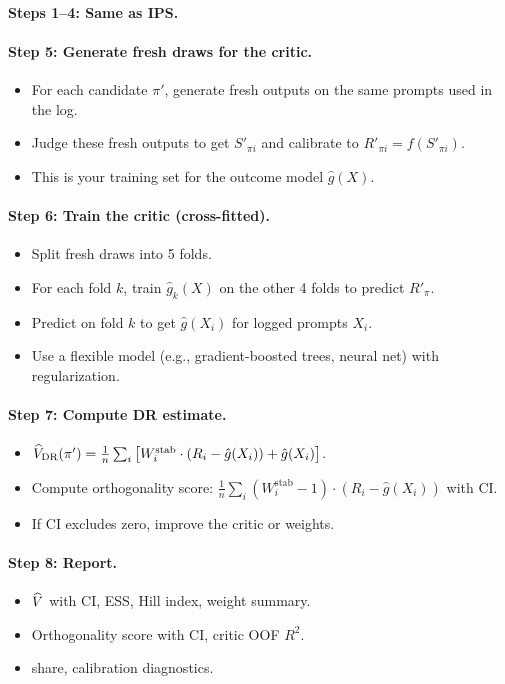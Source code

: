 \paragraph{Steps 1--4: Same as IPS.}

\paragraph{Step 5: Generate fresh draws for the critic.}
\begin{itemize}
\item For each candidate $\pi'$, generate fresh outputs on the same prompts used in the log.
\item Judge these fresh outputs to get $S'_{\pi i}$ and calibrate to $R'_{\pi i} = f(S'_{\pi i})$.
\item This is your training set for the outcome model $\hat{g}(X)$.
\end{itemize}

\paragraph{Step 6: Train the critic (cross-fitted).}
\begin{itemize}
\item Split fresh draws into 5 folds.
\item For each fold $k$, train $\hat{g}_k(X)$ on the other 4 folds to predict $R'_{\pi}$.
\item Predict on fold $k$ to get $\hat{g}(X_i)$ for logged prompts $X_i$.
\item Use a flexible model (e.g., gradient-boosted trees, neural net) with regularization.
\end{itemize}

\paragraph{Step 7: Compute DR estimate.}
\begin{itemize}
\item $\widehat{V}_{\text{DR}}(\pi') = \frac{1}{n} \sum_i \left[ W_i^{\text{stab}} \cdot (R_i - \hat{g}(X_i)) + \hat{g}(X_i) \right]$.
\item Compute orthogonality score: $\frac{1}{n} \sum_i (W_i^{\text{stab}} - 1) \cdot (R_i - \hat{g}(X_i))$ with CI.
\item If CI excludes zero, improve the critic or weights.
\end{itemize}

\paragraph{Step 8: Report.}
\begin{itemize}
\item $\widehat{V}$ with CI, ESS, Hill index, weight summary.
\item Orthogonality score with CI, critic OOF $R^2$.
\item \oua{} share, calibration diagnostics.
\end{itemize}

